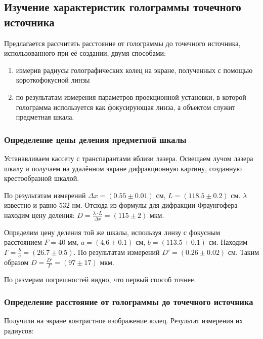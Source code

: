 
\subsection{Изучение характеристик голограммы точечного источника}

    Предлагается рассчитать расстояние от голограммы до точечного 
    источника, использованного при её создании, двумя способами:
    \begin{enumerate}
        \item измерив радиусы голографических колец на экране, 
                полученных с помощью короткофокусной линзы
        \item по результатам измерения параметров проекционной установки, 
              в которой голограмма используется как фокусирующая линза, 
              а объектом служит предметная шкала.
    \end{enumerate}

    \subsubsection*{Определение цены деления предметной шкалы}

        Устанавливаем кассету с транспарантами вблизи лазера. Освещаем лучом лазера шкалу и 
        получаем на удалённом экране дифракционную картину, созданную крестообразной шкалой.

        По результатам измерений $\Delta x = (0.55 \pm 0.01)$ см, $L = (118.5 \pm 0.2)$ см.
        $\lambda$ известно и равно $532$ нм. Отсюда из формулы для дифракции Фраунгофера
        находим цену деления: $D = \frac{\lambda \cdot L}{\Delta x} = (115 \pm 2)$ мкм.

        Определим цену деления той же шкалы, используя линзу с фокусным расстоянием
        $F = 40$ мм, $a = (4.6 \pm 0.1)$ см, $b = (113.5 \pm 0.1)$ см. Находим
        $\Gamma = \frac{b}{a} = (26.7 \pm 0.5)$. По результатам измерений
        $D' = (0.26 \pm 0.02)$ см. Таким образом $D = \frac{D'}{\Gamma} = (97 \pm 17)$ мкм.

        По размерам погрешностей видно, что первый способ точнее.

    \subsubsection*{Определение расстояние от голограммы до точечного источника}

        Получили на экране контрастное изображение колец. Результат измерения их радиусов:


